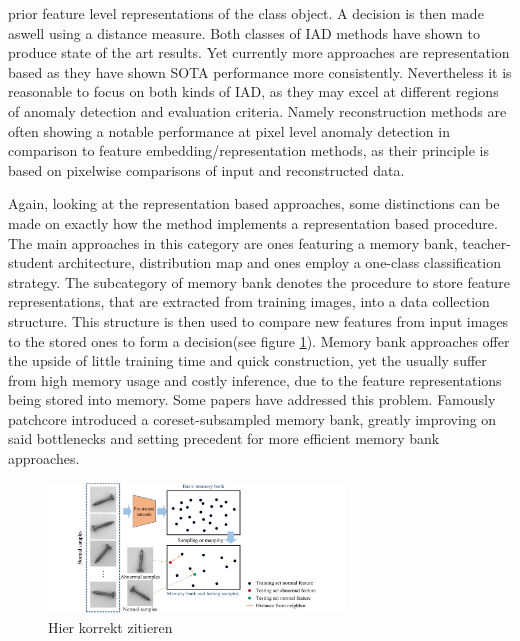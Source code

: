 prior feature level representations of the class object. A decision is then made aswell using a distance measure.\newline
Both classes of IAD methods have shown to produce state of the art results. Yet currently more approaches are representation based \cite{liu2024deep} as they have shown SOTA performance more 
consistently. Nevertheless it is reasonable to focus on both kinds of IAD, as they may excel at different regions of anomaly detection and evaluation criteria. Namely reconstruction methods are 
often showing a notable performance at pixel level anomaly detection in comparison to feature embedding/representation methods, as their principle is based on pixelwise comparisons of input 
and reconstructed data.
\newline


Again, looking at the representation based approaches, some distinctions can be made on exactly how the method implements a representation based procedure.
The main approaches in this category are ones featuring a memory bank, teacher-student architecture, distribution map and ones employ a one-class classification strategy. The subcategory of 
memory bank denotes the procedure to store feature representations, that are extracted from training images, into a data collection structure. This structure is then used to compare new 
features from input images to the stored ones to form a decision(see figure \ref{fig:memorybankviz}). Memory bank approaches offer the upside of little training time and quick construction, yet the usually suffer from high memory 
usage and costly inference, due to the feature representations being stored into memory. Some papers have addressed this problem. Famously patchcore \cite{patchCore2022} introduced a coreset-subsampled 
memory bank, greatly improving on said bottlenecks and setting precedent for more efficient memory bank approaches. \newline

\begin{figure}[H]
    \centering
    \includegraphics[width=0.7\textwidth]{figures/approachvizgeneral/memorybankviz.jpg}
    \caption{Hier korrekt zitieren}
    \label{fig:memorybankviz}
\end{figure}



